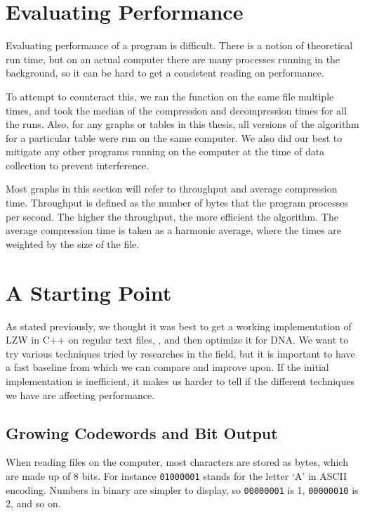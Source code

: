 \documentclass[12pt,twoside]{reedthesis}
\begin{document}
\hypertarget{evaluating-performance}{%
\section{Evaluating Performance}\label{evaluating-performance}}

Evaluating performance of a program is difficult. There is a notion of theoretical run time, but on an actual computer there are many processes running in the background, so it can be hard to get a consistent reading on performance.

To attempt to counteract this, we ran the function on the same file multiple times, and took the median of the compression and decompression times for all the runs. Also, for any graphs or tables in this thesis, all versions of the algorithm for a particular table were run on the same computer. We also did our best to mitigate any other programs running on the computer at the time of data collection to prevent interference.

Most graphs in this section will refer to throughput and average compression time. Throughput is defined as the number of bytes that the program processes per second. The higher the throughput, the more efficient the algorithm. The average compression time is taken as a harmonic average, where the times are weighted by the size of the file.

\hypertarget{a-starting-point}{%
\section{A Starting Point}\label{a-starting-point}}

As stated previously, we thought it was best to get a working implementation of LZW in C++ on regular text files, , and then optimize it for DNA. We want to try various techniques tried by researches in the field, but it is important to have a fast baseline from which we can compare and improve upon. If the initial implementation is inefficient, it makes us harder to tell if the different techniques we have are affecting performance.

\hypertarget{growing-codewords-and-bit-output}{%
\subsection{Growing Codewords and Bit Output}\label{growing-codewords-and-bit-output}}

When reading files on the computer, most characters are stored as bytes, which are made up of 8 bits. For instance \texttt{01000001} stands for the letter `A' in ASCII encoding. Numbers in binary are simpler to display, so \texttt{00000001} is 1, \texttt{00000010} is 2, and so on.
\end{document}
